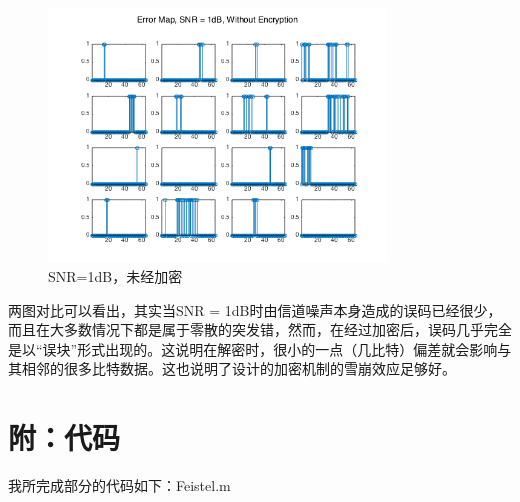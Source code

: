\documentclass[UTF8]{ctexart}
\begin{document}
\begin{figure}[H]
    \centering
    \includegraphics[width = 0.8\textwidth]{error_map_1dB_without.png}
    \caption{SNR=1dB，未经加密}
\end{figure}

两图对比可以看出，其实当SNR = 1dB时由信道噪声本身造成的误码已经很少，而且在大多数情况下都是属于零散的突发错，然而，在经过加密后，误码几乎完全是以“误块”形式出现的。这说明在解密时，很小的一点（几比特）偏差就会影响与其相邻的很多比特数据。这也说明了设计的加密机制的雪崩效应足够好。


\section{附：代码}
我所完成部分的代码如下：Feistel.m

\end{document}
